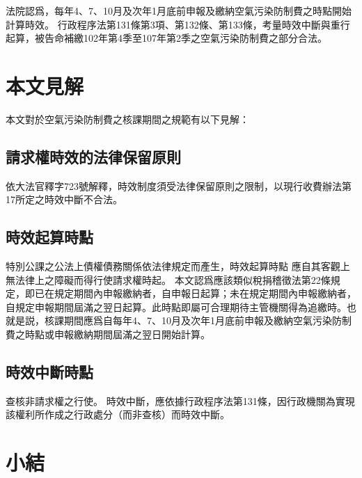 \documentclass[11pt,a4paper]{article}
\begin{document}
法院認爲，每年4、7、10月及次年1月底前申報及繳納空氣污染防制費之時點開始計算時效。
行政程序法第131條第3項、第132條、第133條，考量時效中斷與重行起算，被告命補繳102年第4季至107年第2季之空氣污染防制費之部分合法。





\section{本文見解}


本文對於空氣污染防制費之核課期間之規範有以下見解：

\subsection{請求權時效的法律保留原則}
依大法官釋字723號解釋，時效制度須受法律保留原則之限制，以現行收費辦法第17所定之時效中斷不合法。

\subsection{時效起算時點}
  

特別公課之公法上債權債務關係依法律規定而產生，時效起算時點
應自其客觀上無法律上之障礙而得行使請求權時起。
本文認爲應該類似稅捐稽徵法第22條規定，即已在規定期間內申報繳納者，自申報日起算；未在規定期間內申報繳納者，自規定申報期間屆滿之翌日起算。此時點即屬可合理期待主管機關得為追繳時。也就是説，核課期間應爲自每年4、7、10月及次年1月底前申報及繳納空氣污染防制費之時點或申報繳納期間屆滿之翌日開始計算。

\subsection{時效中斷時點}
查核非請求權之行使。
時效中斷，應依據行政程序法第131條，因行政機關為實現該權利所作成之行政處分（而非查核）而時效中斷。


\section{小結}
\end{document}
